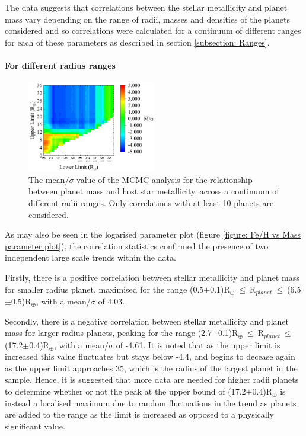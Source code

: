 \documentclass[a4paper,twocolumn,12pt]{article}
\begin{document}
The data suggests that correlations between the stellar metallicity and planet mass vary depending on the range of radii, masses and densities of the planets considered and so correlations were calculated for a continuum of different ranges for each of these parameters as described in section \ref{subsection: Ranges}.


\paragraph{For different radius ranges}

\begin{figure}[h!]
    \centering
    \includegraphics[width=0.5\textwidth]{Graphs/FeH vs Mass correlations - Radii ranges.pdf}
    \caption{The mean/$\sigma$ value of the MCMC analysis for the relationship between planet mass and host star metallicity, across a continuum of different radii ranges. Only correlations with at least 10 planets are considered.}
    \label{figure: Fe/H vs Mass correlations - Radii ranges}
\end{figure}

As may also be seen in the logarised parameter plot (figure \ref{figure: Fe/H vs Mass parameter plot}), the correlation statistics confirmed the presence of two independent large scale trends within the data.

Firstly, there is a positive correlation between stellar metallicity and planet mass for smaller radius planet, maximised for the range (0.5$\pm$0.1)R$_{\oplus}~\leq~$R$_{planet}~\leq~$(6.5$\pm$0.5)R$_{\oplus}$, with a mean/$\sigma$ of 4.03.

Secondly, there is a negative correlation between stellar metallicity and planet mass for larger radius planets, peaking for the range (2.7$\pm$0.1)R$_{\oplus}~\leq~$R$_{planet}~\leq~$(17.2$\pm$0.4)R$_{\oplus}$, with a mean/$\sigma$ of -4.61. It is noted that as the upper limit is increased this value fluctuates but stays below -4.4, and begins to decease again as the upper limit approaches 35, which is the radius of the largest planet in the sample. Hence, it is suggested that more data are needed for higher radii planets to determine whether or not the peak at the upper bound of (17.2$\pm$0.4)R$_{\oplus}$ is instead a localised maximum due to random fluctuations in the trend as planets are added to the range as the limit is increased as opposed to a physically significant value.
\end{document}
